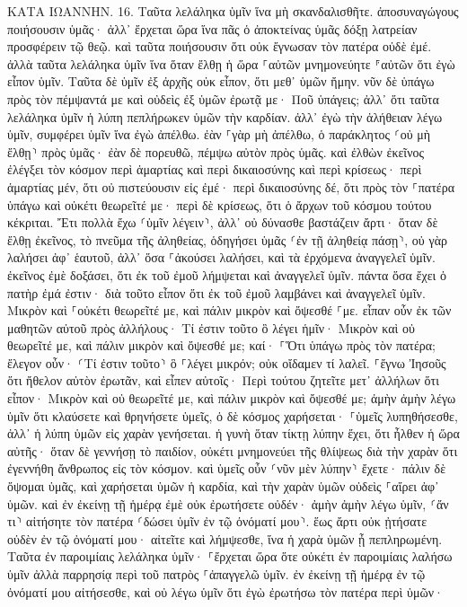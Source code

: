 \documentclass[twoside, 9pt]{extreport}
\begin{document}
ΚΑΤΑ ΙΩΑΝΝΗΝ.
16.
Ταῦτα λελάληκα ὑμῖν ἵνα μὴ σκανδαλισθῆτε. 
ἀποσυναγώγους ποιήσουσιν ὑμᾶς· ἀλλ᾽ ἔρχεται ὥρα ἵνα πᾶς ὁ ἀποκτείνας ὑμᾶς δόξῃ λατρείαν προσφέρειν τῷ θεῷ. 
καὶ ταῦτα ποιήσουσιν ὅτι οὐκ ἔγνωσαν τὸν πατέρα οὐδὲ ἐμέ. 
ἀλλὰ ταῦτα λελάληκα ὑμῖν ἵνα ὅταν ἔλθῃ ἡ ὥρα ⸀αὐτῶν μνημονεύητε ⸁αὐτῶν ὅτι ἐγὼ εἶπον ὑμῖν. Ταῦτα δὲ ὑμῖν ἐξ ἀρχῆς οὐκ εἶπον, ὅτι μεθ᾽ ὑμῶν ἤμην. 
νῦν δὲ ὑπάγω πρὸς τὸν πέμψαντά με καὶ οὐδεὶς ἐξ ὑμῶν ἐρωτᾷ με· Ποῦ ὑπάγεις; 
ἀλλ᾽ ὅτι ταῦτα λελάληκα ὑμῖν ἡ λύπη πεπλήρωκεν ὑμῶν τὴν καρδίαν. 
ἀλλ᾽ ἐγὼ τὴν ἀλήθειαν λέγω ὑμῖν, συμφέρει ὑμῖν ἵνα ἐγὼ ἀπέλθω. ἐὰν ⸀γὰρ μὴ ἀπέλθω, ὁ παράκλητος ⸂οὐ μὴ ἔλθῃ⸃ πρὸς ὑμᾶς· ἐὰν δὲ πορευθῶ, πέμψω αὐτὸν πρὸς ὑμᾶς. 
καὶ ἐλθὼν ἐκεῖνος ἐλέγξει τὸν κόσμον περὶ ἁμαρτίας καὶ περὶ δικαιοσύνης καὶ περὶ κρίσεως· 
περὶ ἁμαρτίας μέν, ὅτι οὐ πιστεύουσιν εἰς ἐμέ· 
περὶ δικαιοσύνης δέ, ὅτι πρὸς τὸν ⸀πατέρα ὑπάγω καὶ οὐκέτι θεωρεῖτέ με· 
περὶ δὲ κρίσεως, ὅτι ὁ ἄρχων τοῦ κόσμου τούτου κέκριται. 
Ἔτι πολλὰ ἔχω ⸂ὑμῖν λέγειν⸃, ἀλλ᾽ οὐ δύνασθε βαστάζειν ἄρτι· 
ὅταν δὲ ἔλθῃ ἐκεῖνος, τὸ πνεῦμα τῆς ἀληθείας, ὁδηγήσει ὑμᾶς ⸂ἐν τῇ ἀληθείᾳ πάσῃ⸃, οὐ γὰρ λαλήσει ἀφ᾽ ἑαυτοῦ, ἀλλ᾽ ὅσα ⸀ἀκούσει λαλήσει, καὶ τὰ ἐρχόμενα ἀναγγελεῖ ὑμῖν. 
ἐκεῖνος ἐμὲ δοξάσει, ὅτι ἐκ τοῦ ἐμοῦ λήμψεται καὶ ἀναγγελεῖ ὑμῖν. 
πάντα ὅσα ἔχει ὁ πατὴρ ἐμά ἐστιν· διὰ τοῦτο εἶπον ὅτι ἐκ τοῦ ἐμοῦ λαμβάνει καὶ ἀναγγελεῖ ὑμῖν. 
Μικρὸν καὶ ⸀οὐκέτι θεωρεῖτέ με, καὶ πάλιν μικρὸν καὶ ὄψεσθέ ⸀με. 
εἶπαν οὖν ἐκ τῶν μαθητῶν αὐτοῦ πρὸς ἀλλήλους· Τί ἐστιν τοῦτο ὃ λέγει ἡμῖν· Μικρὸν καὶ οὐ θεωρεῖτέ με, καὶ πάλιν μικρὸν καὶ ὄψεσθέ με; καί· ⸀Ὅτι ὑπάγω πρὸς τὸν πατέρα; 
ἔλεγον οὖν· ⸂Τί ἐστιν τοῦτο⸃ ὃ ⸀λέγει μικρόν; οὐκ οἴδαμεν τί λαλεῖ. 
⸀ἔγνω Ἰησοῦς ὅτι ἤθελον αὐτὸν ἐρωτᾶν, καὶ εἶπεν αὐτοῖς· Περὶ τούτου ζητεῖτε μετ᾽ ἀλλήλων ὅτι εἶπον· Μικρὸν καὶ οὐ θεωρεῖτέ με, καὶ πάλιν μικρὸν καὶ ὄψεσθέ με; 
ἀμὴν ἀμὴν λέγω ὑμῖν ὅτι κλαύσετε καὶ θρηνήσετε ὑμεῖς, ὁ δὲ κόσμος χαρήσεται· ⸀ὑμεῖς λυπηθήσεσθε, ἀλλ᾽ ἡ λύπη ὑμῶν εἰς χαρὰν γενήσεται. 
ἡ γυνὴ ὅταν τίκτῃ λύπην ἔχει, ὅτι ἦλθεν ἡ ὥρα αὐτῆς· ὅταν δὲ γεννήσῃ τὸ παιδίον, οὐκέτι μνημονεύει τῆς θλίψεως διὰ τὴν χαρὰν ὅτι ἐγεννήθη ἄνθρωπος εἰς τὸν κόσμον. 
καὶ ὑμεῖς οὖν ⸂νῦν μὲν λύπην⸃ ἔχετε· πάλιν δὲ ὄψομαι ὑμᾶς, καὶ χαρήσεται ὑμῶν ἡ καρδία, καὶ τὴν χαρὰν ὑμῶν οὐδεὶς ⸀αἴρει ἀφ᾽ ὑμῶν. 
καὶ ἐν ἐκείνῃ τῇ ἡμέρᾳ ἐμὲ οὐκ ἐρωτήσετε οὐδέν· ἀμὴν ἀμὴν λέγω ὑμῖν, ⸂ἄν τι⸃ αἰτήσητε τὸν πατέρα ⸂δώσει ὑμῖν ἐν τῷ ὀνόματί μου⸃. 
ἕως ἄρτι οὐκ ᾐτήσατε οὐδὲν ἐν τῷ ὀνόματί μου· αἰτεῖτε καὶ λήμψεσθε, ἵνα ἡ χαρὰ ὑμῶν ᾖ πεπληρωμένη. 
Ταῦτα ἐν παροιμίαις λελάληκα ὑμῖν· ⸀ἔρχεται ὥρα ὅτε οὐκέτι ἐν παροιμίαις λαλήσω ὑμῖν ἀλλὰ παρρησίᾳ περὶ τοῦ πατρὸς ⸀ἀπαγγελῶ ὑμῖν. 
ἐν ἐκείνῃ τῇ ἡμέρᾳ ἐν τῷ ὀνόματί μου αἰτήσεσθε, καὶ οὐ λέγω ὑμῖν ὅτι ἐγὼ ἐρωτήσω τὸν πατέρα περὶ ὑμῶν· 
\end{document}

